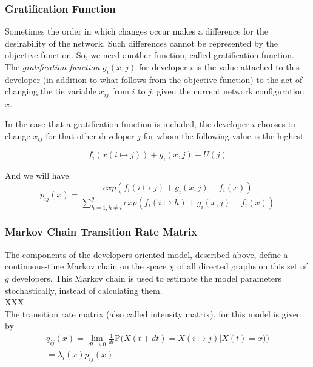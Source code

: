 \documentclass[11pt]{report}
\begin{document}
\subsubsection{Gratification Function}
Sometimes the order in which changes occur makes a difference for the desirability of the network. Such differences cannot be represented by the objective function. So, we need another function, called gratification function. \\

The \textit{gratification function} $g_i(x,j)$ for developer $i$ is the value attached to this developer (in addition to what follows from the objective function) to the act of changing the tie variable $x_{ij}$ from $i$ to $j$, given the current network configuration $x$. 

In the case that a gratification function is included, the developer $i$ chooses to change $x_{ij}$ for that other developer $j$ for whom the following value \cite{Snijders2004} is the highest:

\begin{equation}
f_i(x(i \mapsto j)) + g_i(x, j) + U(j)
\end{equation} 

And we will have 
\begin{equation}
\label{ObjectiveFunctionWithGratification}
p_{ij}(x) = \frac{exp(f_i(i \mapsto j) + g_i(x, j) - f_i(x))}{\sum_{h=1, h \neq i}^{g} exp(f_i(i \mapsto h) + g_i(x, j) - f_i(x))}
\end{equation}

\subsubsection{Markov Chain Transition Rate Matrix}
The components of the developers-oriented model, described above, define a continuous-time Markov chain on the space $\chi$ of all directed graphs on this set of $g$ developers. This Markov chain is used to estimate the model parameters stochastically, instead of calculating them.\\

XXX\\ 

The transition rate matrix (also called intensity matrix), for this model is given by 
\begin{multline}
\label{intensityMatrix}
q_{ij}(x) = \lim_{dt \to 0} \frac{1}{dt} \mathrm {P} \big({X(t + dt) = X(i \mapsto j) | X(t) = x)}\big) \\ = \lambda_i(x) p_{ij}(x)
\end{multline}
\end{document}
